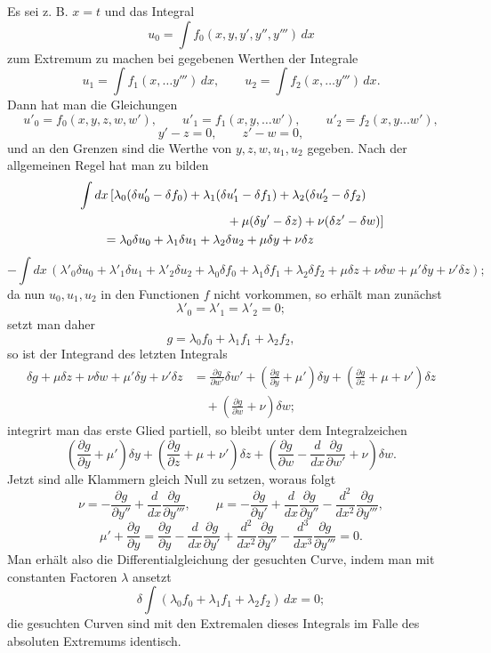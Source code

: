 \documentclass[11pt,a4paper,leqno]{article}
\begin{document}
Es sei z. B. $x=t$ und das Integral
\[
u_0=\int f_0(x,y,y',y'',y''')\,dx
\]
zum Extremum zu machen bei gegebenen Werthen der Integrale
\[
u_1=\int f_1(x,\ldots y''')\,dx,\qquad
u_2=\int f_2(x,\ldots y''')\,dx.
\]
Dann hat man die Gleichungen
\[
u'_0=f_0(x,y,z,w,w'),\qquad
u'_1=f_1(x,y,\ldots w'),\qquad
u'_2=f_2(x,y\ldots w'),
\]
\[
y'-z=0,\qquad z'-w=0,
\]
und an den Grenzen sind die Werthe von $y,z,w,u_1,u_2$ gegeben. Nach der allgemeinen Regel hat man zu bilden
\[
\begin{aligned}
&\int dx\,[\lambda_0(\delta u'_0-\delta f_0)
+\lambda_1(\delta u'_1-\delta f_1)
+\lambda_2(\delta u'_2-\delta f_2)\\
&\hspace{42mm}+\mu(\delta y'-\delta z)+\nu(\delta z'-\delta w)]\\
&\qquad=\lambda_0\delta u_0+\lambda_1\delta u_1+\lambda_2\delta u_2+\mu\delta y+\nu\delta z
\end{aligned}
\]
\[
-\int dx\,(\lambda'_0\delta u_0+\lambda'_1\delta u_1+\lambda'_2\delta u_2
+\lambda_0\delta f_0+\lambda_1\delta f_1+\lambda_2\delta f_2
+\mu\delta z+\nu\delta w+\mu'\delta y+\nu'\delta z);
\]
da nun $u_0,u_1,u_2$ in den Functionen $f$ nicht vorkommen, so erhält man zunächst
\[
\lambda'_0=\lambda'_1=\lambda'_2=0;
\]
setzt man daher
\[
g=\lambda_0f_0+\lambda_1f_1+\lambda_2f_2,
\]
so ist der Integrand des letzten Integrals
\[
\begin{aligned}
\delta g+\mu\delta z+\nu\delta w+\mu'\delta y+\nu'\delta z
&=\frac{\partial g}{\partial w'}\delta w'
+\left(\frac{\partial g}{\partial y}+\mu'\right)\delta y
+\left(\frac{\partial g}{\partial z}+\mu+\nu'\right)\delta z\\
&\quad+\left(\frac{\partial g}{\partial w}+\nu\right)\delta w;
\end{aligned}
\]
integrirt man das erste Glied partiell, so bleibt unter dem Integralzeichen
\[
\left(\frac{\partial g}{\partial y}+\mu'\right)\delta y
+\left(\frac{\partial g}{\partial z}+\mu+\nu'\right)\delta z
+\left(\frac{\partial g}{\partial w}-\frac{d}{dx}\frac{\partial g}{\partial w'}+\nu\right)\delta w.
\]
Jetzt sind alle Klammern gleich Null zu setzen, woraus folgt
\[
\nu=-\frac{\partial g}{\partial y''}+\frac{d}{dx}\frac{\partial g}{\partial y'''},\qquad
\mu=-\frac{\partial g}{\partial y'}+\frac{d}{dx}\frac{\partial g}{\partial y''}
-\frac{d^2}{dx^2}\frac{\partial g}{\partial y'''},
\]
\[
\mu'+\frac{\partial g}{\partial y}
=\frac{\partial g}{\partial y}-\frac{d}{dx}\frac{\partial g}{\partial y'}
+\frac{d^2}{dx^2}\frac{\partial g}{\partial y''}
-\frac{d^3}{dx^3}\frac{\partial g}{\partial y'''}=0.
\]
Man erhält also die Differentialgleichung der gesuchten Curve, indem man mit constanten Factoren $\lambda$ ansetzt
\[
\delta\int(\lambda_0f_0+\lambda_1f_1+\lambda_2f_2)\,dx=0;
\]
die gesuchten Curven sind mit den Extremalen dieses Integrals im Falle des absoluten Extremums identisch.
\end{document}
